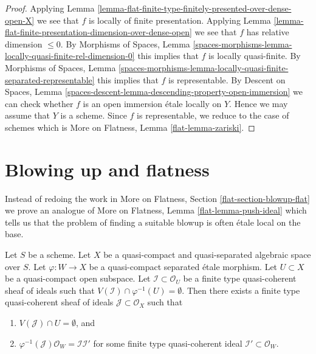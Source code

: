 \begin{proof}
Applying
Lemma \ref{lemma-flat-finite-type-finitely-presented-over-dense-open-X}
we see that $f$ is locally of finite presentation. Applying
Lemma \ref{lemma-flat-finite-presentation-dimension-over-dense-open}
we see that $f$ has relative dimension $\leq 0$.
By Morphisms of Spaces, Lemma
\ref{spaces-morphisms-lemma-locally-quasi-finite-rel-dimension-0}
this implies that $f$ is locally quasi-finite.
By Morphisms of Spaces, Lemma
\ref{spaces-morphisms-lemma-locally-quasi-finite-separated-representable}
this implies that $f$ is representable.
By Descent on Spaces, Lemma
\ref{spaces-descent-lemma-descending-property-open-immersion}
we can check whether $f$ is an open immersion \'etale locally on $Y$.
Hence we may assume that $Y$ is a scheme. Since $f$ is representable,
we reduce to the case of schemes which is
More on Flatness, Lemma \ref{flat-lemma-zariski}.
\end{proof}







\section{Blowing up and flatness}
\label{section-blowup-flat}

\noindent
Instead of redoing the work in
More on Flatness, Section \ref{flat-section-blowup-flat}
we prove an analogue of More on Flatness, Lemma \ref{flat-lemma-push-ideal}
which tells us that the problem of finding a suitable blowup
is often \'etale local on the base.

\begin{lemma}
\label{lemma-push-ideal}
Let $S$ be a scheme. Let $X$ be a quasi-compact and quasi-separated
algebraic space over $S$. Let $\varphi : W \to X$ be a quasi-compact
separated \'etale morphism. Let $U \subset X$ be a quasi-compact open
subspace. Let $\mathcal{I} \subset \mathcal{O}_U$ be a finite type
quasi-coherent sheaf of ideals such that
$V(\mathcal{I}) \cap \varphi^{-1}(U) = \emptyset$.
Then there exists a finite type quasi-coherent sheaf of ideals
$\mathcal{J} \subset \mathcal{O}_X$ such that
\begin{enumerate}
\item $V(\mathcal{J}) \cap U = \emptyset$, and
\item $\varphi^{-1}(\mathcal{J})\mathcal{O}_W = \mathcal{I} \mathcal{I}'$
for some finite type quasi-coherent ideal
$\mathcal{I}' \subset \mathcal{O}_W$.
\end{enumerate}
\end{lemma}

